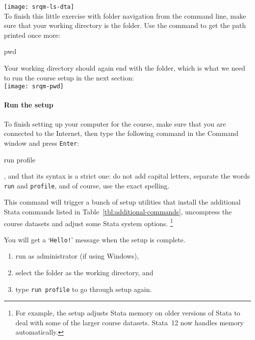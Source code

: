 		\texttt{[image: srqm-ls-dta]}\\[1em]
	
	To finish this little exercise with folder navigation from the command line, make sure that your working directory is the \SRQM folder. Use the  command to get the path printed once more:%
	
		\begin{docspec}
			pwd
		\end{docspec}
	
	Your working directory should again end with the \SRQM folder, which is what we need to run the course setup in the next section:\\[1em]%
	
		\texttt{[image: srqm-pwd]}\\[1em]
  
  \paragraph{Run the \SRQM setup}%
		\label{sec:setup}%

	To finish setting up your computer for the course, make sure that you are connected to the Internet, then type the following command in the Command window and press \texttt{Enter}:%
		
		\begin{docspec}
			run profile
		\end{docspec}
	
	, and that its syntax is a strict one: do not add capital letters, separate the words \texttt{run} and \texttt{profile}, and of course, use the exact spelling.%
	
	This command will trigger a bunch of setup utilities that install the additional Stata commands listed in Table~\ref{tbl:additional-commands}, uncompress the course datasets and adjust some Stata system options.%
		\footnote{For example, the setup adjusts Stata memory on older versions of Stata to deal with some of the larger course datasets. Stata~12 now handles memory automatically.} %
		
	
  
	You will get a `\texttt{Hello!}' message when the setup is complete.%
	
		\begin{enumerate}
			\item run as administrator (if using Windows),
			\item select the \SRQM folder as the working directory, and
			\item type \texttt{run profile} to go through setup again.
		\end{enumerate}
	  
